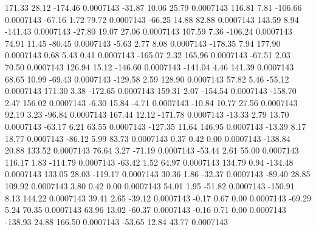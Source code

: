       171.33       28.12     -174.46     0.0007143
      -31.87       10.06       25.79     0.0007143
      116.81        7.81     -106.66     0.0007143
      -67.16        1.72       79.72     0.0007143
      -66.25       14.88       82.88     0.0007143
      143.59        8.94     -141.43     0.0007143
      -27.80       19.07       27.06     0.0007143
      107.59        7.36     -106.24     0.0007143
       74.91       11.45      -80.45     0.0007143
       -5.63        2.77        8.08     0.0007143
     -178.35        7.94      177.90     0.0007143
        0.68        5.43        0.41     0.0007143
     -165.07        2.32      165.96     0.0007143
      -67.51        2.03       70.50     0.0007143
      126.94       15.12     -146.60     0.0007143
     -141.04        4.46      141.39     0.0007143
       68.65       10.99      -69.43     0.0007143
     -129.58        2.59      128.90     0.0007143
       57.82        5.46      -55.12     0.0007143
      171.30        3.38     -172.65     0.0007143
      159.31        2.07     -154.54     0.0007143
     -158.70        2.47      156.02     0.0007143
       -6.30       15.84       -4.71     0.0007143
      -10.84       10.77       27.56     0.0007143
       92.19        3.23      -96.84     0.0007143
      167.44       12.12     -171.78     0.0007143
      -13.33        2.79       13.70     0.0007143
      -63.17        6.21       63.55     0.0007143
     -127.35       11.64      146.95     0.0007143
      -13.39        8.17       18.77     0.0007143
      -86.12        5.99       83.73     0.0007143
        0.37        0.42        0.00     0.0007143
     -138.84       20.88      133.52     0.0007143
       76.64        3.27      -71.19     0.0007143
      -53.44        2.61       55.00     0.0007143
      116.17        1.83     -114.79     0.0007143
      -63.42        1.52       64.97     0.0007143
      134.79        0.94     -134.48     0.0007143
      133.05       28.03     -119.17     0.0007143
       30.36        1.86      -32.37     0.0007143
      -89.40       28.85      109.92     0.0007143
        3.80        0.42        0.00     0.0007143
       54.01        1.95      -51.82     0.0007143
     -150.91        8.13      144.22     0.0007143
       39.41        2.65      -39.12     0.0007143
       -0.17        0.67        0.00     0.0007143
      -69.29        5.24       70.35     0.0007143
       63.96       13.02      -60.37     0.0007143
       -0.16        0.71        0.00     0.0007143
     -138.93       24.88      166.50     0.0007143
      -53.65       12.84       43.77     0.0007143
